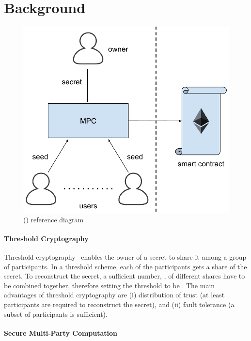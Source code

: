\vspace*{-2pt}
\section{Background}\label{sect:background}

\begin{figure}[tp]
	\centering
	\includegraphics[width=.75\columnwidth]{fig/proposal}
	\vspace*{11pt}
	\caption{\name (\shortname) reference diagram}
	\label{fig:model}
\end{figure}




\paragraph*{Threshold Cryptography}

Threshold cryptography~\cite{Shamir:1979:SS:359168.359176} enables the owner of a secret to share it among a group of participants. 
In a \KofN threshold scheme, each of the \N participants gets a share of the secret. 
To reconstruct the secret, a sufficient number, \K, of different shares have to be combined together, therefore setting the threshold to be \KofN.
The main advantages of threshold cryptography are (i) distribution of trust (at least \K participants are required to reconstruct the secret), and (ii) fault tolerance (a subset of \N participants is sufficient).

\smallskip

\paragraph*{Secure Multi-Party Computation}

